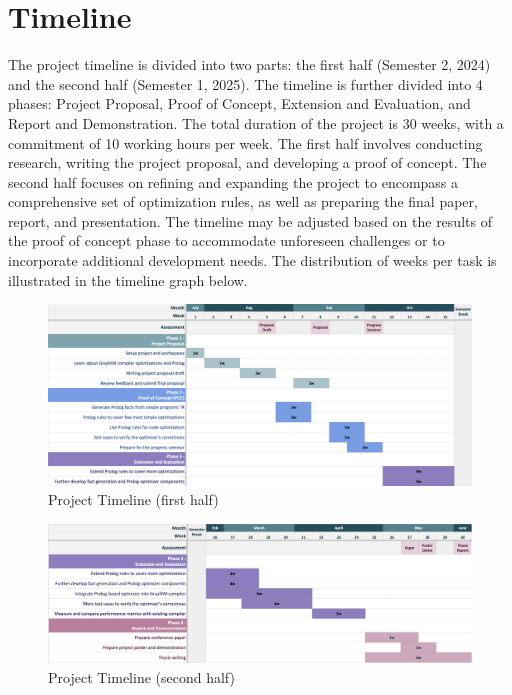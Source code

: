 \section{Timeline}
The project timeline is divided into two parts: the first half (Semester 2, 2024) and the second half (Semester 1, 2025). The timeline is further divided into 4 phases: Project Proposal, Proof of Concept, Extension and Evaluation, and Report and Demonstration. The total duration of the project is 30 weeks, with a commitment of 10 working hours per week. The first half involves conducting research, writing the project proposal, and developing a proof of concept. The second half focuses on refining and expanding the project to encompass a comprehensive set of optimization rules, as well as preparing the final paper, report, and presentation. The timeline may be adjusted based on the results of the proof of concept phase to accommodate unforeseen challenges or to incorporate additional development needs.  The distribution of weeks per task is illustrated in the timeline graph below.

\begin{figure}[h]
    \includegraphics[width=1\textwidth]{Packages/PartA.png}
    \caption{Project Timeline (first half)}
\end{figure}
\begin{figure}[h]
    \includegraphics[width=1\textwidth]{Packages/PartB.png}
    \caption{Project Timeline (second half)}
\end{figure}

